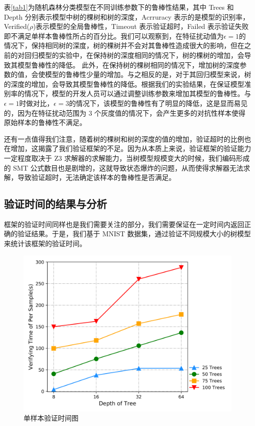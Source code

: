 表\ref{tab1}为随机森林分类模型在不同训练参数下的鲁棒性结果，其中 Trees 和 Depth 分别表示模型中树的棵树和树的深度，Acrruracy 表示的是模型的识别率，Verified($\rho$)表示模型的全局鲁棒性，Timeout 表示验证超时，Failed 表示验证失败即不满足单样本鲁棒性所占的百分比。我们可以观察到，在特征扰动值为$\epsilon=1$的情况下，保持相同树的深度，树的棵树并不会对其鲁棒性造成很大的影响，但在之前的对回归模型的实验中，在保持树的深度相同的情况下，树的棵树的增加，会导致其模型鲁棒性的降低。
此外，在保持树的棵树相同的情况下，增加树的深度参数的值，会使模型的鲁棒性少量的增加。与之相反的是，对于其回归模型来说，树的深度的增加，会导致其模型鲁棒性的降低。根据我们的实验结果，在保证模型准别率的情况下，模型的开发人员可以通过调整训练参数来增加其模型的鲁棒性。与$\epsilon=1$时做对比，$\epsilon=3$的情况下，该模型的鲁棒性有了明显的降低，这是显而易见的，因为在特征扰动范围为 3 个灰度值的情况下，会产生更多的对抗性样本使得原始样本的鲁棒性不满足。

还有一点值得我们注意，随着树的棵树和树的深度的值的增加，验证超时的比例也在增加，这揭露了我们验证框架的不足。因为从本质上来说，验证框架的验证能力一定程度取决于 Z3 求解器的求解能力，当树模型规模变大的时候，我们编码形成的 SMT 公式数目也是剧增的，这就导致状态爆炸的问题，从而使得求解器无法求解，导致验证超时，无法确定该样本的鲁棒性是否满足。

\subsection{验证时间的结果与分析}
框架的验证时间同样也是我们需要关注的部分，我们需要保证在一定时间内返回正确的验证结果。于是，我们基于 MNIST 数据集，通过验证不同规模大小的树模型来统计该框架的验证时间。
\begin{figure}[!hbt]
\centering
	\includegraphics[scale=0.7]{fig2/C5/mnist_time.png}
	\caption{单样本验证时间图}
	\label{fig:mnist_time.png}	
\end{figure}


